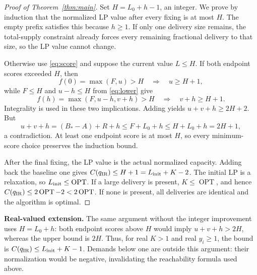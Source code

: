 \documentclass[11pt]{article}
\newcommand{\OPT}{\operatorname{OPT}}
\begin{document}
\begin{proof}[Proof of Theorem~\ref{thm:main}]
Set $H=L_0+h-1$, an integer. We prove by induction that the normalized
LP value after every fixing is at most $H$. The empty prefix satisfies
this because $h\ge1$. If only one delivery size remains, the total-supply
constraint already forces every remaining fractional delivery to that
size, so the LP value cannot change.

Otherwise use \eqref{eq:score} and suppose the current value $L\le H$.
If both endpoint scores exceeded $H$, then
\[
f(0)=\max(F,u)>H\quad\Longrightarrow\quad u\ge H+1,
\]
while $F\le H$ and $u-h\le H$ from \eqref{eq:lower} give
\[
f(h)=\max(F,u-h,v+h)>H\quad\Longrightarrow\quad v+h\ge H+1.
\]
Integrality is used in these two implications. Adding yields
$u+v+h\ge2H+2$. But
\[
u+v+h=(B_*-A)+R+h
\le F+L_0+h\le H+L_0+h=2H+1,
\]
a contradiction. At least one endpoint score is at most $H$, so every
minimum-score choice preserves the induction bound.

After the final fixing, the LP value is the actual normalized capacity.
Adding back the baseline one gives
$C(q_{\rm IR})\le H+1=L_{\rm init}+K-2$.
The initial LP is a relaxation, so $L_{\rm init}\le\OPT$.
If a large delivery is present, $K\le\OPT$, and hence
$C(q_{\rm IR})\le2\OPT-2<2\OPT$.
If none is present, all deliveries are identical and the algorithm is optimal.
\end{proof}

\noindent\textbf{Real-valued extension.}
The same argument without the integer improvement uses $H=L_0+h$:
both endpoint scores above $H$ would imply $u+v+h>2H$, whereas the upper
bound is $2H$. Thus, for real $K>1$ and real $y_i\ge1$, the bound is
$C(q_{\rm IR})\le L_{\rm init}+K-1$. Demands below one are outside this
argument: their normalization would be negative, invalidating the reachability
formula used above.
\end{document}
